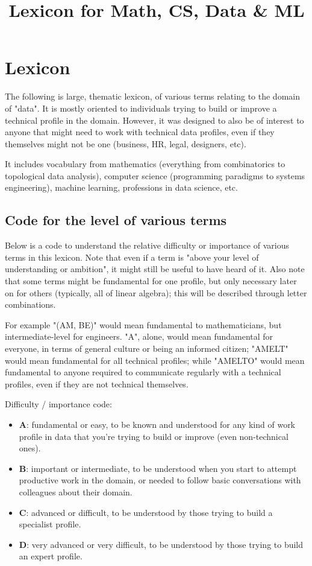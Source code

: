 \documentclass{article}
\title{Lexicon for Math, CS, Data & ML}
\begin{document}
\section*{Lexicon}

The following is large, thematic lexicon, of various terms relating to the domain of "data". It is mostly oriented to individuals trying to build or improve a technical profile in the domain. However, it was designed to also be of interest to anyone that might need to work with technical data profiles, even if they themselves might not be one (business, HR, legal, designers, etc).

It includes vocabulary from mathematics (everything from combinatorics to topological data analysis), computer science (programming paradigms to systems engineering), machine learning, professions in data science, etc.




\subsection*{Code for the level of various terms}

Below is a code to understand the relative difficulty or importance of various terms in this lexicon. Note that even if a term is "above your level of understanding or ambition", it might still be useful to have heard of it. Also note that some terms might be fundamental for one profile, but only necessary later on for others (typically, all of linear algebra); this will be described through letter combinations.

For example "(AM, BE)" would mean fundamental to mathematicians, but intermediate-level for engineers. "A", alone, would mean fundamental for everyone, in terms of general culture or being an informed citizen; "AMELT" would mean fundamental for all technical profiles; while "AMELTO" would mean fundamental to anyone required to communicate regularly with a technical profiles, even if they are not technical themselves.

Difficulty / importance code:

\begin{itemize}
	\item \textbf{A}: fundamental or easy, to be known and understood for any kind of work profile in data that you're trying to build or improve (even non-technical ones).
	\item \textbf{B}: important or intermediate, to be understood when you start to attempt productive work in the domain, or needed to follow basic conversations with colleagues about their domain.
	\item \textbf{C}: advanced or difficult, to be understood by those trying to build a specialist profile.
	\item \textbf{D}: very advanced or very difficult, to be understood by those trying to build an expert profile.
\end{itemize}
\end{document}
